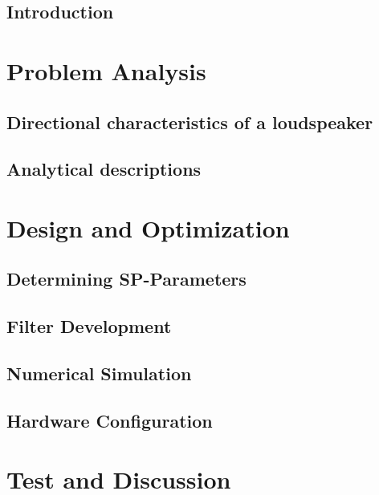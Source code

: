 \glsresetall
 \graphicspath{{figures/analysing/}}
\chapter{Introduction}\label{ch:intro}

\part{Problem Analysis}\label{pt:analysis} \glsresetall
 \graphicspath{{figures/analysing/}}
	\chapter{Directional characteristics of a loudspeaker}\label{ch:directional}
		
		
	\chapter{Analytical descriptions}\label{ch:analytical}
		


	



\part{Design and Optimization}\label{pt:design} 
\graphicspath{{figures/design/}}	
\chapter{Determining SP-Parameters}\label{ch:optimization}
	 		
\chapter{Filter Development}
	
\chapter{Numerical Simulation}\label{ch:numerical} 
	  
	 
\chapter{Hardware Configuration}
	 

\part{Test and Discussion}\label{pt:test}
\graphicspath{{figures/tests/}}
